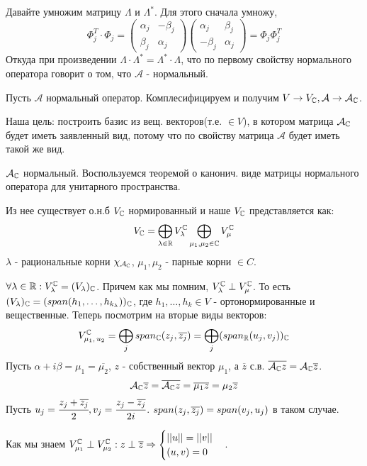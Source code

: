 Давайте умножим матрицу $\Lambda$ и $\Lambda^*$. Для этого сначала умножу, $$\Phi_j^T \cdot \Phi_j = \begin{pmatrix}
    \alpha_j &-\beta_j\\
    \beta_j & \alpha_j
\end{pmatrix} \begin{pmatrix}
    \alpha_j & \beta_j \\
    -\beta_j & \alpha_j
\end{pmatrix} = \Phi_j \Phi_j^T$$ Откуда при произведении $\Lambda \cdot \Lambda^* = \Lambda^* \cdot \Lambda$, что по первому свойству нормального оператора говорит о том, что $\mathcal{A}$ - нормальный.


Пусть $\mathcal{A}$ нормальный оператор. Комплесифицируем и получим $V \rightarrow{} V_{\mathbb{C}}, \mathcal{A}\rightarrow{} \mathcal{A}_{\mathbb{C}}$.

Наша цель: построить базис из вещ. векторов(т.е. $\in V$), в котором матрица $\mathcal{A}_{\mathbb{C}}$ будет иметь заявленный вид, потому что по свойству матрица $\mathcal{A}$ будет иметь такой же вид.

$\mathcal{A}_{\mathbb{C}}$ нормальный. Воспользуемся теоремой о канонич. виде матрицы нормального оператора для унитарного пространства.

Из нее существует о.н.б $V_{\mathbb{C}}$ нормированный и наше $V_{\mathbb{C}}$ представляется как:
$$V_{\mathbb{C}} = \bigoplus\limits_{\lambda \in \mathbb{R}} V_\lambda^{\mathbb{C}}\bigoplus\limits_{\mu_1,\mu_2 \in \mathbb{C}}V_\mu^{\mathbb{C}}$$
$\lambda$ - рациональные корни $\chi_{\mathcal{A}_{\mathbb{C}}}$, $\mu_1,\mu_2$ - парные корни $\in C$.

$\forall \lambda \in \mathbb{R}: V_\lambda^{\mathbb{C}} = (V_\lambda)_{\mathbb{C}}$. Причем как мы помним, $V_\lambda^{\mathbb{C}} \perp V_\mu^{\mathbb{C}}$. То есть $(V_\lambda)_{\mathbb{C}} = (span(h_1,\ldots,h_{k_\lambda}))_{\mathbb{C}}$, где $h_1,\ldots,h_k  \in V$ - ортонормированные и вещественные. Теперь посмотрим на вторые виды векторов:
$$V_{\mu_1,\,u_2}^{\mathbb{C}} = \bigoplus\limits_j span_{\mathbb{C}} (z_j, \overline{z_j}) = \bigoplus\limits_j(span_{\mathbb{R}}(u_j,v_j))_{\mathbb{C}}$$
Пусть $\alpha + i\beta = \mu_1 = \overline{\mu_2}$, $z$ - собственный вектор $\mu_1$, а $\overline{z}$ с.в.  $\overline{\mathcal{A}_{\mathbb{C}} z} = \mathcal{A}_{\mathbb{C}} \overline{z}$.
$$\mathcal{A}_{\mathbb{C}} \overline{z} = \overline{\mathcal{A}_{\mathbb{C}} z} = \overline{\mu_1 z} = \mu_2\overline{z}$$
Пусть $u_j =\cfrac{z_j + \overline{z_j}}{2}, v_j = \cfrac{z_j -\overline{z_j}}{2i}$. $span (z_j, \overline{z_j}) = span(v_j,u_j)$ в таком случае.

Как мы знаем $V_{\mu_1}^{\mathbb{C}}\perp V_{\mu_2}^{\mathbb{C}}: z \perp \overline{z} \Rightarrow \begin{cases}
    ||u || = ||v||\\
    (u,v) = 0
\end{cases}$.

